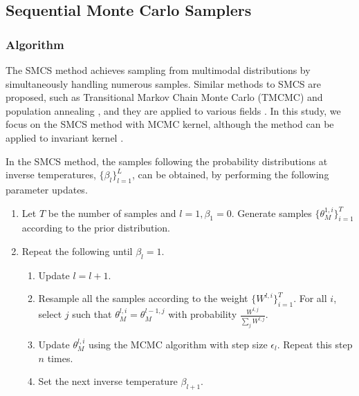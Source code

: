 \documentclass[12pt]{article}
\begin{document}
\subsection{Sequential Monte Carlo Samplers}
\subsubsection{Algorithm}
The SMCS method \cite{neal2001annealed, chopin2002sequential, del2006sequential} achieves sampling from multimodal distributions by simultaneously handling numerous samples.
Similar methods to SMCS are proposed, such as Transitional Markov Chain Monte Carlo (TMCMC) \cite{ching2007transitional} and population annealing \cite{hukushima2003population}, and they are applied to various fields \cite{lye2021sampling,weigel2021understanding}.
In this study, we focus on the SMCS method with MCMC kernel, although the method can be applied to invariant kernel \cite{del2006sequential}. \par
In the SMCS method, the samples following the probability distributions at inverse temperatures, $\{\beta_l\}_{l=1}^L$, can be obtained, by performing the following parameter updates. 
\begin{enumerate}
  \item Let $T$ be the number of samples and $l = 1, \beta_1 = 0$. Generate samples $\{\theta_M^{1,i}\}_{i=1}^T$ according to the prior distribution.
  \item Repeat the following until $\beta_l = 1$.
  \begin{enumerate}
    \item Update $l = l + 1$.
    \item Resample all the samples according to the weight $\{W^{l,i}\}_{i = 1}^T$. For all $i$, select $j$ such that $\theta_M^{l,i} = \theta_M^{l-1,j}$ with probability $\frac{W^{l,j}}{\sum_j W^{l,j}}$.
    \item Update $\theta_M^{l,i}$ using the MCMC algorithm with step size $\epsilon_l$. Repeat this step $n$ times.
    \item Set the next inverse temperature $\beta_{l + 1}$.
  \end{enumerate}
\end{enumerate}
\end{document}
